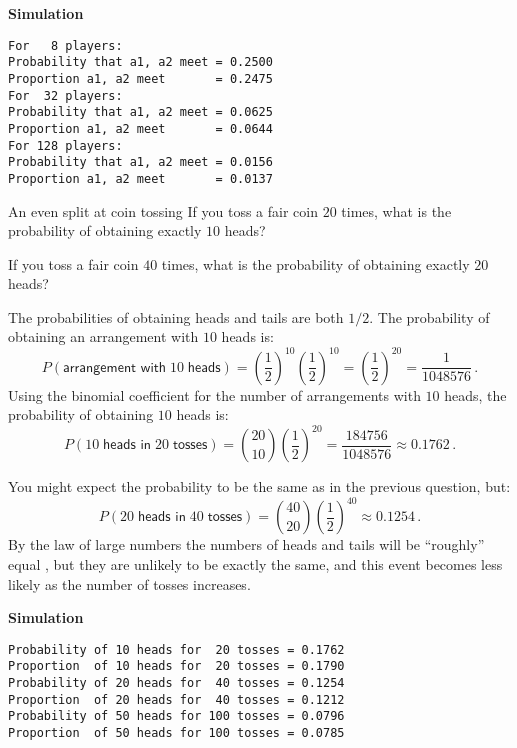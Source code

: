 \textbf{Simulation}
\begin{verbatim}
For   8 players:
Probability that a1, a2 meet = 0.2500
Proportion a1, a2 meet       = 0.2475
For  32 players:
Probability that a1, a2 meet = 0.0625
Proportion a1, a2 meet       = 0.0644
For 128 players:
Probability that a1, a2 meet = 0.0156
Proportion a1, a2 meet       = 0.0137
\end{verbatim}


\begin{prob}{An even split at coin tossing}
 If you toss a fair coin $20$ times, what is the probability of obtaining exactly $10$ heads?

 If you toss a fair coin $40$ times, what is the probability of obtaining exactly $20$ heads?
\end{prob}

\solution{}

 The probabilities of obtaining heads and tails are both $1/2$. The probability of obtaining an arrangement with $10$ heads is:
\[
P(\textsf{arrangement with}\;10\;\textsf{heads}) =\left(\frac{1}{2}\right)^{10} \left(\frac{1}{2}\right)^{10} = \left(\frac{1}{2}\right)^{20} = \frac{1}{1048576}\,.
\]
Using the binomial coefficient for the number of arrangements with $10$ heads, the probability of obtaining $10$ heads is:
\[
P(10\;\textsf{heads in}\; 20\; \textsf{tosses})={20 \choose 10} \left(\frac{1}{2}\right)^{20} = \frac{184756}{1048576}\approx 0.1762\,.
\]

 You might expect the probability to be the same as in the previous question, but:
\[
P(20\;\textsf{heads in}\; 40\; \textsf{tosses})={40 \choose 20} \left(\frac{1}{2}\right)^{40}\approx 0.1254\,.
\]
By the law of large numbers the numbers of heads and tails will be ``roughly'' equal \cite[Section~8.4]{ross}, but they are unlikely to be exactly the same, and this event becomes less likely as the number of tosses increases.

\textbf{Simulation}
\begin{verbatim}
Probability of 10 heads for  20 tosses = 0.1762
Proportion  of 10 heads for  20 tosses = 0.1790
Probability of 20 heads for  40 tosses = 0.1254
Proportion  of 20 heads for  40 tosses = 0.1212
Probability of 50 heads for 100 tosses = 0.0796
Proportion  of 50 heads for 100 tosses = 0.0785
\end{verbatim}


